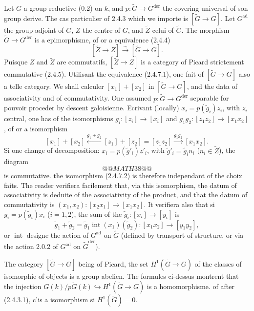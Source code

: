 \documentclass[12pt,a4paper]{article}
\theoremstyle{plain}
\theoremstyle{definition}
\theoremstyle{remark}
\DeclareMathOperator{\Int}{int}
\newcommand{\simto}{\xrightarrow{\sim}}
\begin{document}
Let $G$ a group reductive (0.2) on $k$, and $p:\tilde{G} \to G^{\text{der}}$ the covering universal of son group derive. The cas particulier of 2.4.3 which we importe is $[\tilde{G} \to G]$. Let $G^{\text{ad}}$ the group adjoint of $G$, $Z$ the centre of $G$, and $\tilde{Z}$ celui of $\tilde{G}$. The morphism $\tilde{G} \to G^{\text{der}}$ is a epimorphisme, of or a equivalence (2.4.4)
\begin{equation}\label{eq:2.4.7.1}
[\tilde{Z} \to Z] \simto [\tilde{G} \to G].
\end{equation}
Puisque $Z$ and $\tilde{Z}$ are commutatifs, $[\tilde{Z} \to Z]$ is a category of Picard strictement commutative (2.4.5). Utilisant the equivalence (2.4.7.1), one fait of $[\tilde{G} \to G]$ also a telle category. We shall calculer $[x_1] + [x_2]$ in $[\tilde{G} \to G]$, and the data of associativity and of commutativity. One assumed $p:\tilde{G} \to G^{\text{der}}$ separable for pouvoir proceder by descent galoisienne. Ecrivant (locally) $x_i = p(\tilde{g}_i)z_i$, with $z_i$ central, one has of the isomorphisms $g_i: [z_i] \to [x_i]$ and $g_1g_2: [z_1z_2] \to [x_1x_2]$, of or a isomorphism
\begin{equation}\label{eq:2.4.7.2}
[x_1] + [x_2] \xleftarrow{g_1+g_2} [z_1] + [z_2] = [z_1z_2] \xrightarrow{g_1g_2} [x_1x_2].
\end{equation}
Si one change of decomposition: $x_i = p(\tilde{g}'_i)z'_i$, with $\tilde{g}'_i = \tilde{g}_i n_i$ ($n_i \in \tilde{Z}$), the diagram
\[
@@MATH38@@
\]
is commutative. the isomorphism (2.4.7.2) is therefore independant of the choix faits. The reader verifiera facilement that, via this isomorphism, the datum of associativity is deduite of the associativity of the product, and that the datum of commutativity is $(x_1,x_2): [x_2x_1] \to [x_1x_2]$. It verifiera also that si $y_i = p(\tilde{g}_i)x_i$ ($i=1,2$), the sum of the $\tilde{g}_i: [x_i] \to [y_i]$ is
\[
\tilde{g}_1 + \tilde{g}_2 = \tilde{g}_1 \Int(x_1)(\tilde{g}_2): [x_1x_2] \to [y_1y_2],
\]
or $\Int$ designe the action of $G^{\text{ad}}$ on $\tilde{G}$ (defined by transport of structure, or via the action 2.0.2 of $G^{\text{ad}}$ on $\tilde{G}^{\text{der}}$).

The category $[\tilde{G} \to G]$ being of Picard, the set $H^1(\tilde{G} \to G)$ of the classes of isomorphie of objects is a group abelien. The formules ci-dessus montrent that the injection $G(k)/p\tilde{G}(k) \hookrightarrow H^1(\tilde{G} \to G)$ is a homomorphisme. of after (2.4.3.1), c'is a isomorphism si $H^1(\tilde{G}) = 0$.
\end{document}
